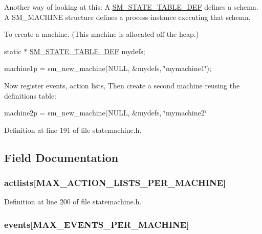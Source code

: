 Another way of looking at this\-: A \hyperlink{struct_s_m___s_t_a_t_e___t_a_b_l_e___d_e_f}{S\-M\-\_\-\-S\-T\-A\-T\-E\-\_\-\-T\-A\-B\-L\-E\-\_\-\-D\-E\-F} defines a schema. A S\-M\-\_\-\-M\-A\-C\-H\-I\-N\-E structure defines a process instance executing that schema.

To create a machine. (This machine is allocated off the heap.)

static $\ast$ \hyperlink{struct_s_m___s_t_a_t_e___t_a_b_l_e___d_e_f}{S\-M\-\_\-\-S\-T\-A\-T\-E\-\_\-\-T\-A\-B\-L\-E\-\_\-\-D\-E\-F} mydefs;

machine1p = sm\-\_\-new\-\_\-machine(N\-U\-L\-L, \&mydefs, \char`\"{}mymachine1\char`\"{});

Now register events, action lists, Then create a second machine reusing the definitions table\-:

machine2p = sm\-\_\-new\-\_\-machine(N\-U\-L\-L, \&mydefs, \char`\"{}mymachine2\char`\"{} 

Definition at line 191 of file statemachine.\-h.



\subsection{Field Documentation}
\hypertarget{struct_s_m___s_t_a_t_e___t_a_b_l_e___d_e_f_a2d009396b23b93fbc7cd65d7604206af}{
\subsubsection[{actlists}]{ actlists\mbox{[}{\bf M\-A\-X\-\_\-\-A\-C\-T\-I\-O\-N\-\_\-\-L\-I\-S\-T\-S\-\_\-\-P\-E\-R\-\_\-\-M\-A\-C\-H\-I\-N\-E}\mbox{]}}}\label{struct_s_m___s_t_a_t_e___t_a_b_l_e___d_e_f_a2d009396b23b93fbc7cd65d7604206af}


Definition at line 200 of file statemachine.\-h.

\hypertarget{struct_s_m___s_t_a_t_e___t_a_b_l_e___d_e_f_a0ead43d89832f9888dd4f3503c7b5e43}{
\subsubsection[{events}]{ events\mbox{[}{\bf M\-A\-X\-\_\-\-E\-V\-E\-N\-T\-S\-\_\-\-P\-E\-R\-\_\-\-M\-A\-C\-H\-I\-N\-E}\mbox{]}}}\label{struct_s_m___s_t_a_t_e___t_a_b_l_e___d_e_f_a0ead43d89832f9888dd4f3503c7b5e43}


